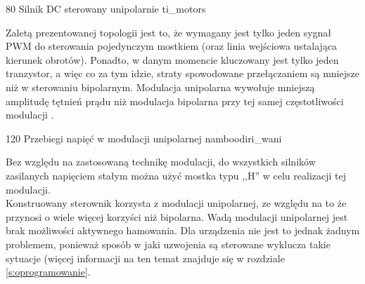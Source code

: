 	{80}
	{Silnik DC sterowany unipolarnie}
	{ti_motors}


Zaletą prezentowanej topologii jest to, że wymagany jest tylko jeden sygnał PWM do sterowania pojedynczym mostkiem (oraz linia wejściowa ustalająca kierunek obrotów). Ponadto, w danym momencie kluczowany jest tylko jeden tranzystor, a więc co za tym idzie, straty spowodowane przełączaniem są mniejsze niż w sterowaniu bipolarnym. Modulacja unipolarna wywołuje mniejszą amplitudę tętnień prądu niż modulacja bipolarna przy tej samej częstotliwości modulacji \cite{zawirski}. 

	{120}
	{Przebiegi napięć w modulacji unipolarnej}
	{namboodiri_wani}

Bez względu na zastosowaną technikę modulacji, do wszystkich silników zasilanych napięciem stałym można użyć mostka typu ,,H'' w celu realizacji tej modulacji. \\

Konstruowany sterownik korzysta z modulacji unipolarnej, ze względu na to że przynosi o wiele więcej korzyści niż bipolarna. Wadą modulacji unipolarnej jest brak możliwości aktywnego hamowania. Dla urządzenia nie jest to jednak żadnym problemem, ponieważ sposób w jaki uzwojenia są sterowane wyklucza takie sytuacje (więcej informacji na ten temat znajduje się w rozdziale \ref{s:oprogramowanie}.





